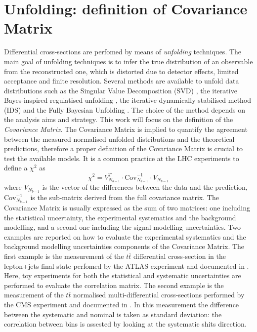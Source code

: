 \documentclass[12pt]{article}
\begin{document}
\section{Unfolding: definition of Covariance Matrix}
Differential cross-sections are perfomed by means of \emph{unfolding} techniques. The main goal of unfolding techniques is to infer the true distribution of an observable from the reconstructed one, which is distorted due to detector effects, limited acceptance and finite resolution. 
Several methods are available to unfold data distributions such as the Singular Value Decomposition (SVD) \cite{H_cker_1996}, the iterative Bayes-inspired regulatised unfolding \cite{DAGOSTINI1995487}, the iterative dynamically stabilised method (IDS) \cite{malaescu2009iterative} and the Fully Bayesian Unfolding \cite{choudalakis2012fully}. The choice of the method depends on the analysis aims and strategy. 
This work will focus on the definition of the \emph{Covariance Matrix}. The Covariance Matrix is implied to quantify the agreement between the measured normalised unfolded distributions and the theoretical predictions, therefore a proper definition of the Covariance Matrix is crucial to test the available models. It is a common practice at the LHC experiments to define a $\chi^2$ as
\begin{equation}
\chi^2 = V^T_{N_{b-1}}\cdot\mathrm{Cov}^{-1}_{N_{b-1}}\cdot V_{N_{b-1}}
\end{equation}
where $V_{N_{b-1}}$ is the vector of the differences between the data and the prediction, $\mathrm{Cov}^{-1}_{N_{b-1}}$ is the sub-matrix derived from the full covariance matrix.
The Covariance Matrix is usually expressed as the sum of two matrices: one including the statistical uncertainty, the experimental systematics and the background modelling, and a second one including the signal modelling uncertainties. 
Two examples are reported on how to evaluate the experimental systematics and the background modelling uncertainties components of the Covariance Matrix.
The first example is the measurement of the $t\bar{t}$ differential cross-section in the lepton+jets final state perfomed by the ATLAS experiment and documented in \cite{atlas_diffrential}. Here, toy experiments for both the statistical and systematic uncertainties are performed to evaluate the correlation matrix.
The second example is the measurement of the $t\bar{t}$ normalised multi-differential cross-sections performed by the CMS experiment and documented in \cite{Sirunyan_2020}. In this measurement the difference between the systematic and nominal is taken as standard deviation: the correlation between bins is assested by looking at the systematic shits direction.
\end{document}
